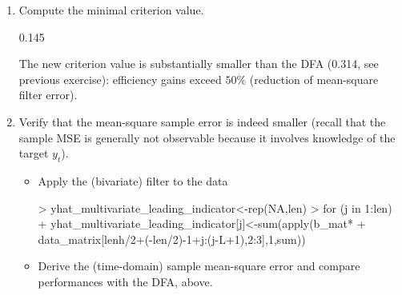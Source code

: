 \documentclass[a4paper]{book}
\begin{document}
\begin{enumerate}
\begin{Schunk}
\begin{Sinput}
> mdfa_obj<-MDFA_mse(L,weight_func,Lag,Gamma)$mdfa_obj 
> # Filter coefficients
> b_mat<-mdfa_obj$b
> dimnames(b_mat)[[2]]<-c("x","leading indicator")
> dimnames(b_mat)[[1]]<-paste("Lag ",0:(L-1),sep="")#dim(b_mat)
> head(b_mat)
\end{Sinput}
\begin{Soutput}
               x leading indicator
Lag 0 0.20556332        0.39969599
Lag 1 0.35970890       -0.08021796
Lag 2 0.21659593       -0.18695421
Lag 3 0.14359475       -0.06108555
Lag 4 0.13724690       -0.02475913
Lag 5 0.06399915       -0.09717151
\end{Soutput}
\end{Schunk}
The top-coefficient (the first six only are shown) in the second column assigns most weight to the last observation of the leading-indicator: this observation is particular because it leads the original data. In direct comparison with the first column, the other coefficients are generally smaller (in absolute value) because the leading-indicator is contaminated by noise (the coefficients in the first column must be shifted down in order to make meaningful cross-sectional comparisons).  
\item Compute the minimal criterion value.
\begin{Schunk}
\begin{Soutput}
[1] 0.145
\end{Soutput}
\end{Schunk}
The new criterion value is substantially smaller than the DFA (0.314, see previous exercise): efficiency gains exceed $50\%$ (reduction of mean-square filter error).
\item  Verify that the mean-square sample error is indeed smaller (recall that the sample MSE is generally not observable because it involves knowledge of the target $y_t$).
\begin{itemize}
\item Apply the (bivariate) filter to the data
\begin{Schunk}
\begin{Sinput}
> yhat_multivariate_leading_indicator<-rep(NA,len)
> for (j in 1:len)
+   yhat_multivariate_leading_indicator[j]<-sum(apply(b_mat*
+                   data_matrix[lenh/2+(-len/2)-1+j:(j-L+1),2:3],1,sum))
\end{Sinput}
\end{Schunk}
\item Derive the (time-domain) sample mean-square error and compare performances with the DFA, above.

\end{itemize}
\end{enumerate}
\end{document}
